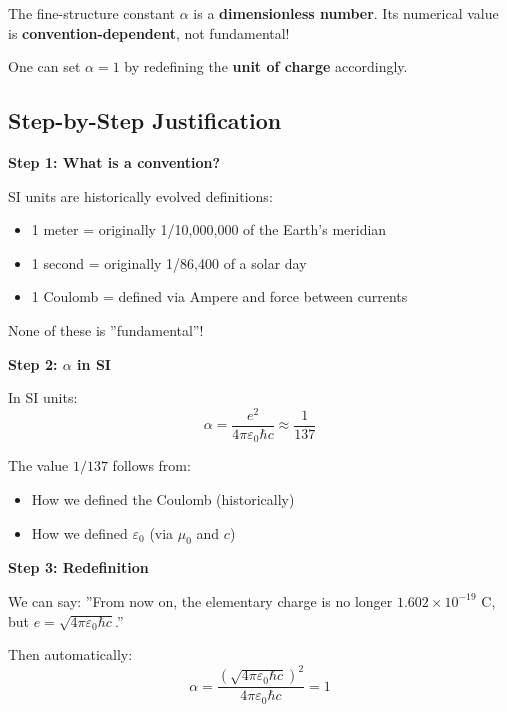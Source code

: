 	\begin{tcolorbox}[colback=blue!5!white,colframe=blue!75!black,title=Core Statement]
		The fine-structure constant $\alpha$ is a \textbf{dimensionless number}. Its numerical value is \textbf{convention-dependent}, not fundamental!
		
		One can set $\alpha = 1$ by redefining the \textbf{unit of charge} accordingly.
	\end{tcolorbox}
	
	\subsection{Step-by-Step Justification}
	
	\textbf{Step 1: What is a convention?}
	
	SI units are historically evolved definitions:
	\begin{itemize}
		\item 1 meter = originally 1/10,000,000 of the Earth's meridian
		\item 1 second = originally 1/86,400 of a solar day
		\item 1 Coulomb = defined via Ampere and force between currents
	\end{itemize}
	
	None of these is ''fundamental''!
	
	\textbf{Step 2: $\alpha$ in SI}
	
	In SI units:
	\begin{equation}
		\alpha = \frac{e^2}{4\pi\varepsilon_0\hbar c} \approx \frac{1}{137}
	\end{equation}
	
	The value $1/137$ follows from:
	\begin{itemize}
		\item How we defined the Coulomb (historically)
		\item How we defined $\varepsilon_0$ (via $\mu_0$ and $c$)
	\end{itemize}
	
	\textbf{Step 3: Redefinition}
	
	We can say: ''From now on, the elementary charge is no longer $1.602 \times 10^{-19}$ C, but $e = \sqrt{4\pi\varepsilon_0\hbar c}$.''
	
	Then automatically:
	\begin{equation}
		\alpha = \frac{(\sqrt{4\pi\varepsilon_0\hbar c})^2}{4\pi\varepsilon_0\hbar c} = 1
	\end{equation}
	
